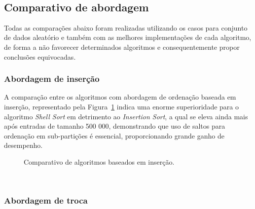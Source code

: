 \documentclass[conference]{IEEEtran}
\begin{document}
~\\
\subsection{Comparativo de abordagem}

Todas as comparações abaixo foram realizadas utilizando os casos para conjunto de dados aleatório e também com as melhores implementações de cada algoritmo, de forma a não favorecer determinados algoritmos e consequentemente propor conclusões equivocadas.
~\\
\subsubsection{Abordagem de inserção}

A comparação entre os algoritmos com abordagem de ordenação baseada em inserção, representado pela Figura~\ref{image: graph-insercao} indica uma enorme superioridade para o algoritmo \textit{Shell Sort} em detrimento ao \textit{Insertion Sort}, a qual se eleva ainda mais após entradas de tamanho 500 000, demonstrando que uso de saltos para ordenação em sub-partições é essencial, proporcionando grande ganho de desempenho.

\begin{figure}
\centering
{}
\caption{Comparativo de algoritmos baseados em inserção.}
\label{image: graph-insercao}
\end{figure}
~\\
\subsubsection{Abordagem de troca}
\end{document}
